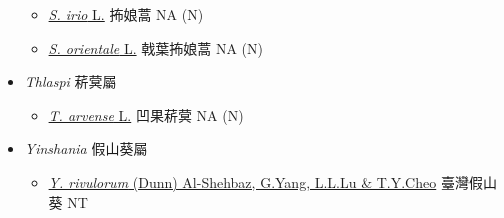 \begin{itemize}
  \begin{itemize}
        \item[] \href{http://www.theplantlist.org/tpl1.1/search?q=Sisymbrium+irio}{\textit{S. irio} L.}   抪娘蒿   NA (N)
        \item[] \href{http://www.theplantlist.org/tpl1.1/search?q=Sisymbrium+orientale}{\textit{S. orientale} L.}   戟葉抪娘蒿   NA (N)
  \end{itemize}
 \item[] \textit{Thlaspi} 菥蓂屬
                                
  \begin{itemize}
        \item[] \href{http://www.theplantlist.org/tpl1.1/search?q=Thlaspi+arvense}{\textit{T. arvense} L.}   凹果菥蓂   NA (N)
  \end{itemize}
 \item[] \textit{Yinshania} 假山葵屬
                                
  \begin{itemize}
        \item[] \href{http://www.theplantlist.org/tpl1.1/search?q=Yinshania+rivulorum}{\textit{Y. rivulorum} (Dunn) Al-Shehbaz, G.Yang, L.L.Lu \& T.Y.Cheo}   臺灣假山葵   NT
  \end{itemize}
  \end{itemize}
